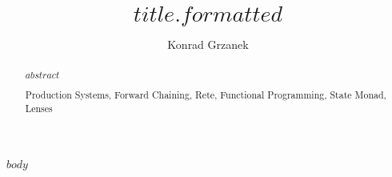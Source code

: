 \documentclass[runningheads,a4paper]{llncs}
\newcommand{\keywords}[1]{\par\addvspace\baselineskip
\noindent\keywordname\enspace\ignorespaces#1}
\begin{document}
\mainmatter
\title{$title.formatted$}

\author{Konrad Grzanek} 


\maketitle

\begin{abstract}
  $abstract$

  \keywords{Production Systems, Forward Chaining, Rete, Functional
    Programming, State Monad, Lenses}

\end{abstract}

$body$
\end{document}
